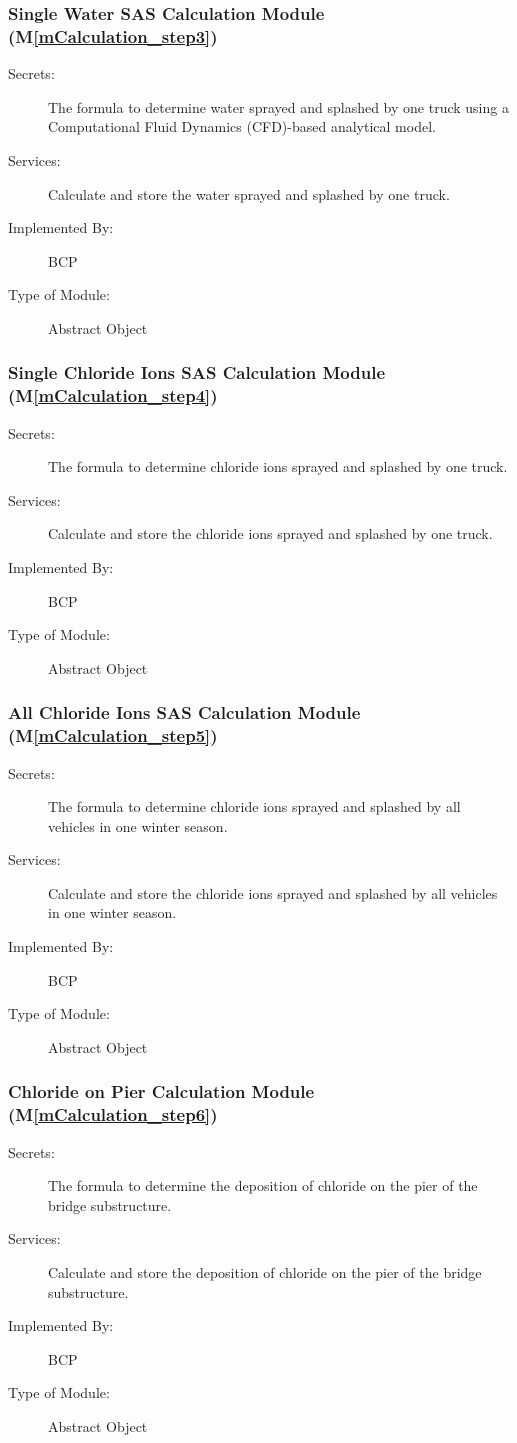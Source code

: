 \documentclass[12pt, titlepage]{article}
\newcommand{\mref}[1]{M\ref{#1}}
\begin{document}
\subsubsection{Single Water SAS Calculation Module (\mref{mCalculation_step3})}
\begin{description}
\item[Secrets:] The formula to determine water sprayed and splashed by one truck using a Computational Fluid Dynamics (CFD)-based analytical model.
\item[Services:] Calculate and store the water sprayed and splashed by one truck.
\item[Implemented By:] BCP
\item[Type of Module:] Abstract Object
\end{description}

\subsubsection{Single Chloride Ions SAS Calculation Module (\mref{mCalculation_step4})}
\begin{description}
\item[Secrets:] The formula to determine chloride ions sprayed and splashed by one truck.
\item[Services:] Calculate and store the chloride ions sprayed and splashed by one truck.
\item[Implemented By:] BCP
\item[Type of Module:] Abstract Object
\end{description}

\subsubsection{All Chloride Ions SAS Calculation Module (\mref{mCalculation_step5})}
\begin{description}
\item[Secrets:] The formula to determine chloride ions sprayed and splashed by all vehicles in one winter season.
\item[Services:] Calculate and store the chloride ions sprayed and splashed by all vehicles in one winter season.
\item[Implemented By:] BCP
\item[Type of Module:] Abstract Object
\end{description}

\subsubsection{Chloride on Pier Calculation Module (\mref{mCalculation_step6})}
\begin{description}
\item[Secrets:] The formula to determine the deposition of chloride on the pier of the bridge substructure.
\item[Services:] Calculate and store the deposition of chloride on the pier of the bridge substructure.
\item[Implemented By:] BCP
\item[Type of Module:] Abstract Object
\end{description}
\end{document}
